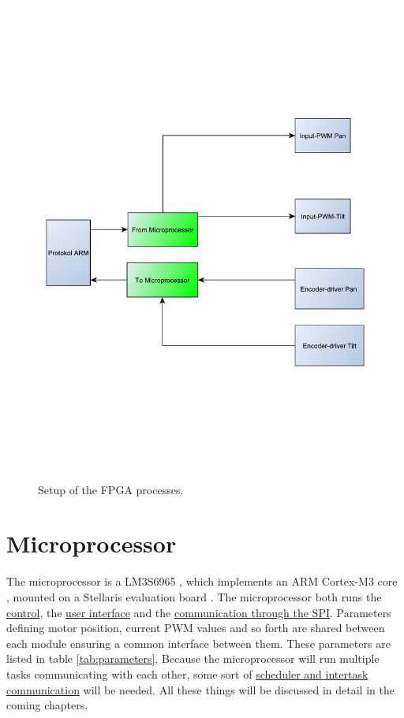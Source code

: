 \begin{figure}[htb]
	\centering
	\includegraphics[scale=0.42,trim=200 200 200 200]{graphics/FPGA} %
	\caption{Setup of the FPGA processes.}
	\label{fig:FPGA}			%
\end{figure}

\section{Microprocessor}\label{sec:microprocessor}

The microprocessor is a LM3S6965 \cite{lm3s6965}, which implements an ARM Cortex-M3 core \cite{cm3}, mounted on a Stellaris evaluation board \cite{evalboard}. The microprocessor both runs the \hyperref[chap:control_system]{control}, the \hyperref[chap:ui]{user interface} and the \hyperref[sec:armspi]{communication through the SPI}. Parameters defining motor position, current PWM values and so forth are shared between each module ensuring a common interface between them. These parameters are listed in table \ref{tab:parameters}. Because the microprocessor will run multiple tasks communicating with each other, some sort of \hyperref[chap:os]{scheduler and intertask communication} will be needed. All these things will be discussed in detail in the coming chapters.

